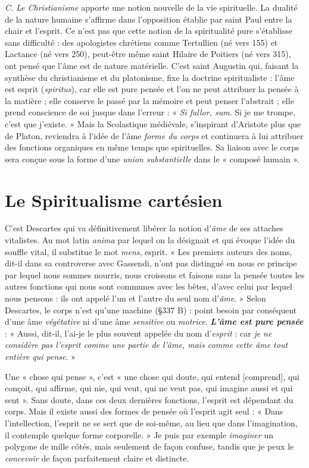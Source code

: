 {{\it C.} \textsf{\textit {Le Christianisme}} apporte une notion nouvelle de la vie spirituelle. La
dualité de la nature humaine s'affirme dans l'opposition établie par
saint Paul entre la chair et l'esprit. Ce n’est pas que cette notion de la
spiritualité pure s'établisse sans difficulté : des apologistes chrétiens comme
Tertullien (né vers 155) et Lactance (né vers 250), peut-être même
saint Hilaire de Poitiers (né vers 315), ont pensé que l’âme est de nature
matérielle. C'est saint Augustin qui, faisant la synthèse du christianisme
et du platonisme, fixe la doctrine spiritualiste : l’âme est esprit ({\it spiritus}),
car elle est pure pensée et l’on ne peut attribuer la pensée à la matière ; elle
conserve le passé par la mémoire et peut penser l’abstrait ; elle prend
conscience de soi jusque dans l'erreur : « {\it Si fallor, sum}. Si je me trompe, c’est
que j’existe. » Mais la Scolastique médiévale, s'inspirant d’Aristote plus
que de Platon, reviendra à l'idée de l’âme {\it forme du corps} et continuera à lui
attribuer des fonctions organiques en même temps que spirituelles. Sa
liaison avec le corps sera conçue sous la forme d’une \textsf{\textit {union substantielle}} dans
le « composé humain ».}
\vspace{0.31cm}

\section{Le Spiritualisme cartésien}%
C'est Descartes qui va
définitivement libérer la notion d'{\it âme} de ses attaches vitalistes.
Au mot latin {\it anima} par lequel on la désignait et qui évoque l’idée du
souffle vital, il substitue le mot {\it mens}, esprit. « Les premiers auteurs
des noms, dit-il dans sa controverse avec Gassendi, n’ont pas distingué
en nous ce principe par lequel nous sommes nourris, nous croissons et
faisons sans la pensée toutes les autres fonctions qui nous sont
communes avec les bêtes, d’avec celui par lequel nous pensons : ils
ont appelé l’un et l’autre du seul nom d’{\it âme}. » Selon Descartes,
le corps n’est qu’une machine (\S 337 B) : point besoin par conséquent
d’une âme {\it végétative} ni d’une âme {\it sensitive} ou {\it motrice}.
\textbf{\textit {L'âme est
pure pensée}} : « Aussi, dit-il, l’ai-je le plus souvent appelée du nom
d'{\it esprit} : car {\it je ne considère pas l'esprit comme une partie de l'âme,
mais comme cette âme tout entière qui pense}. »

\vspace{0.24cm}
{\footnotesize 
Une « chose qui pense », c'est « une chose qui doute, qui entend [comprend],
qui conçoit, qui affirme, qui nie, qui veut, qui ne veut pas, qui
imagine aussi et qui sent ». Sans doute, dans ces deux dernières fonctions,
l'esprit est dépendant du corps. Mais il existe aussi des formes de pensée
où l'esprit agit seul : « Dans l’intellection, l'esprit ne se sert que de soi-même,
au lieu que dans l'imagination, il contemple quelque forme corporelle. »
Je puis par exemple {\it imaginer} un polygone de mille côtés, mais
seulement de façon confuse, tandis que je peux le {\it concevoir} de façon
parfaitement claire et distincte.}
\vspace{0.31cm}

